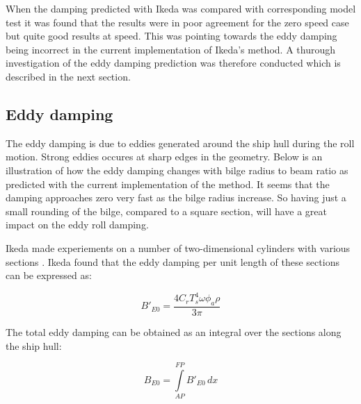     When the damping predicted with Ikeda was compared with corresponding
model test it was found that the results were in poor agreement for the
zero speed case but quite good results at speed. This was pointing
towards the eddy damping being incorrect in the current implementation
of Ikeda's method. A thurough investigation of the eddy damping
prediction was therefore conducted which is described in the next
section.

    \subsection{Eddy damping}\label{eddy-damping}

The eddy damping is due to eddies generated around the ship hull during
the roll motion. Strong eddies occures at sharp edges in the geometry.
Below is an illustration of how the eddy damping changes with bilge
radius to beam ratio as predicted with the current implementation of the
method. It seems that the damping approaches zero very fast as the bilge
radius increase. So having just a small rounding of the bilge, compared
to a square section, will have a great impact on the eddy roll damping.

    \begin{figure}
        \begin{center}\end{center}
        \caption{}
        \label{}
    \end{figure}
    
    Ikeda made experiements on a number of two-dimensional cylinders with
various sections \cite{7505983/4AFVVGNT}. Ikeda found that the eddy
damping per unit length of these sections can be expressed as:
 
            
    
    \begin{equation}
B'_{E0} = \frac{4 C_{r} T_{s}^{4} \omega \phi_{a} \rho}{3 \pi}
\label{eq:equation}
\end{equation}

    

    The total eddy damping can be obtained as an integral over the sections
along the ship hull:
 
            
    
    \begin{equation}
B_{E0} = \int\limits_{AP}^{FP} B'_{E0}\, dx
\label{eq:equation}
\end{equation}

